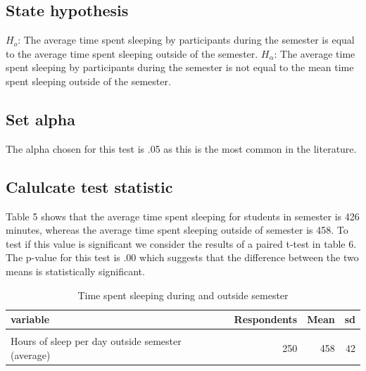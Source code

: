 \documentclass[preprint, 3p,
authoryear]{elsarticle} %
\begin{document}
\hypertarget{state-hypothesis-1}{%
\subsection{State hypothesis}\label{state-hypothesis-1}}

\(H_o\): The average time spent sleeping by participants during the
semester is equal to the average time spent sleeping outside of the
semester. \(H_\alpha\): The average time spent sleeping by participants
during the semester is not equal to the mean time spent sleeping outside
of the semester.

\hypertarget{set-alpha-1}{%
\subsection{Set alpha}\label{set-alpha-1}}

The alpha chosen for this test is .05 as this is the most common in the
literature.

\hypertarget{calulcate-test-statistic-1}{%
\subsection{Calulcate test statistic}\label{calulcate-test-statistic-1}}

Table 5 shows that the average time spent sleeping for students in
semester is 426 minutes, whereas the average time spent sleeping outside
of semester is 458. To test if this value is significant we consider the
results of a paired t-test in table 6. The p-value for this test is .00
which suggests that the difference between the two means is
statistically significant.

\begin{table}

\caption{\label{tab:unnamed-chunk-7}Time spent sleeping during and outside semester}
\centering
\fontsize{7}{9}\selectfont
\begin{tabular}[t]{l|r|r|r}
\hline
\textbf{variable} & \textbf{Respondents} & \textbf{Mean} & \textbf{sd}\\
\hline
\cellcolor{gray!6}{Hours of sleep per day during semester (average)} & \cellcolor{gray!6}{250} & \cellcolor{gray!6}{426} & \cellcolor{gray!6}{45}\\
\hline
Hours of sleep per day outside semester (average) & 250 & 458 & 42\\
\hline
\end{tabular}
\end{table}
\end{document}
